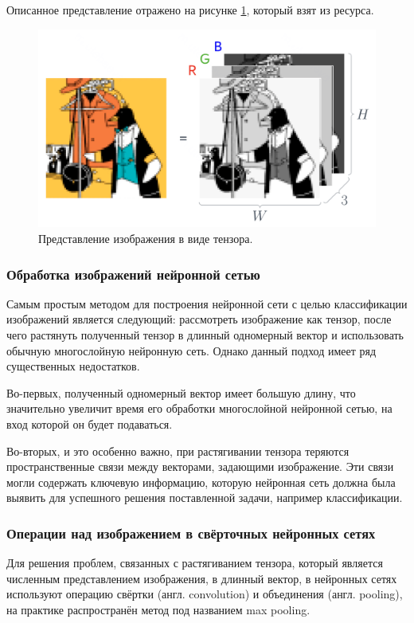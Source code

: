 \documentclass[14pt, russian]{scrartcl}
\begin{document}
Описанное представление отражено на рисунке \ref{fig:tensor}, который взят из ресурса\cite{yandex}.
\begin{figure}[H]
	\centering
	\begin{minipage}[t]{.5\textwidth}
		\centering
		\includegraphics[width=\linewidth]{./img/tensor.png}
	\end{minipage}
	\caption{Представление изображения в виде тензора.}
	\label{fig:tensor}
\end{figure}

\subsubsection{Обработка изображений нейронной сетью}
Самым простым методом для построения нейронной сети с целью классификации изображений является следующий: рассмотреть изображение как тензор, после чего растянуть полученный тензор в длинный одномерный вектор и использовать обычную многослойную нейронную сеть. Однако данный подход имеет ряд существенных недостатков.

Во-первых, полученный одномерный вектор имеет большую длину, что значительно увеличит время его обработки многослойной нейронной сетью, на вход которой он будет подаваться.

Во-вторых, и это особенно важно, при растягивании тензора теряются пространственные связи между векторами, задающими изображение. Эти связи могли содержать ключевую информацию, которую нейронная сеть должна была выявить для успешного решения поставленной задачи, например классификации.

\subsubsection{Операции над изображением в свёрточных нейронных сетях}
Для решения проблем, связанных с растягиванием тензора, который является численным представлением изображения, в длинный вектор, в нейронных сетях используют операцию свёртки (англ. convolution) и объединения (англ. pooling), на практике распространён метод под названием max pooling\cite{itmo}. 
\end{document}
